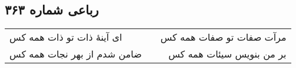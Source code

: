 \begin{center}
\section*{رباعی شماره ۳۶۳}
\label{sec:sh363}
\begin{longtable}{l p{0.5cm} r}
ای آینهٔ ذات تو ذات همه کس
&&
مرآت صفات تو صفات همه کس
\\
ضامن شدم از بهر نجات همه کس
&&
بر من بنویس سیئات همه کس
\\
\end{longtable}
\end{center}
